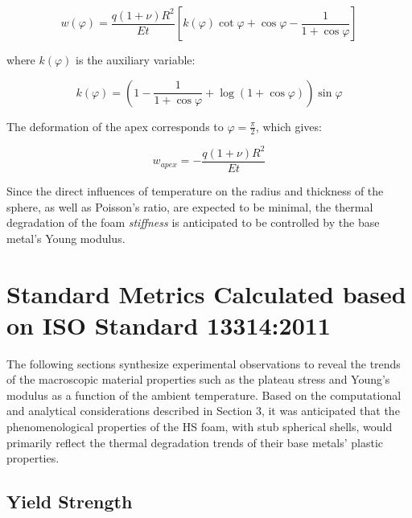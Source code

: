\documentclass[review]{elsarticle}
\begin{document}
{\begin{equation}\label{Eq6}
w(\varphi)=\frac{q(1+\nu)R^2}{Et}\left [ k(\varphi)\cot\varphi+\cos \varphi- \frac{1}{1+\cos\varphi} \right ]
\end{equation}


where $k(\varphi)$ is the auxiliary variable:

\begin{equation}\label{Eq7}
k(\varphi)=\left ( 1- \frac{1}{1+\cos\varphi} + \log(1+\cos\varphi) \right ) \sin \varphi
\end{equation}

The deformation of the apex corresponds to $\varphi=\frac{\pi}{2}$, which gives:

\begin{equation}\label{Eq8}
w_{apex}=-\frac{q(1+\nu)R^2}{Et}
\end{equation}

Since the direct influences of temperature on the radius and thickness of the sphere, as well as Poisson’s ratio, are expected to be minimal, the thermal degradation of the foam \emph{stiffness} is anticipated to be controlled by the base metal’s Young modulus.

\section{Standard Metrics Calculated based on ISO Standard 13314:2011}

The following sections synthesize experimental observations to reveal the trends of the macroscopic material properties such as the plateau stress and Young’s modulus as a function of the ambient temperature. Based on the computational and analytical considerations described in Section 3, it was anticipated that the phenomenological properties of the HS foam, with stub spherical shells, would primarily reflect the thermal degradation trends of their base metals' plastic properties.

\subsection{Yield Strength}

}
\end{document}
